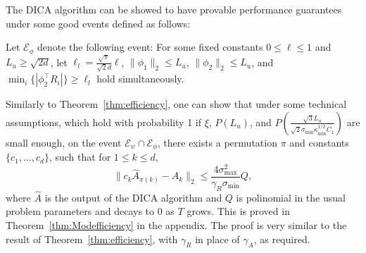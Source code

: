 \documentclass[twoside,11pt]{article}
\newcommand{\Epsi}{\mathcal{E}_{\psi}}
\newcommand{\Ephi}{\mathcal{E}_{\phi}}
\begin{document}
The DICA algorithm can be showed to have provable performance guarantees under some good events defined as follows:
\begin{definition}
Let $\Ephi$ denote the following event:
For some fixed constants $0\le \ell\le 1$ and $L_u \ge \sqrt{2d}$, let $\ell_l = \frac{\sqrt{\pi}}{\sqrt{2}d}\ell$,
$\|\phi_1\|_2 \le L_u$, $\|\phi_2\|_2 \le L_u$, and $\min_i \{|\phi_2^{\top}R_i|\} \ge \ell_l$ hold simultaneously.
\end{definition}  
Similarly to Theorem~\ref{thm:efficiency}, one can show that under some technical assumptions, which 
hold with probability 1 if $\xi$, $P(L_u)$, and $P\left(\frac{\sqrt{3}L_u}{\sqrt{2}\sigma_{\min}\kappa_{\min}^{1/2}C_1}\right)$  are small enough,
on the event $\Epsi \cap\Ephi$,  there exists a permutation $\pi$ and constants $\{c_1,\ldots,c_d\}$, such that for $1\le k\le d$,
\[
\| c_k\hat{A}_{\pi(k)} - A_k\|_2 \le \frac{4\sigma^2_{\max}}{\gamma_R\sigma_{\min}} Q,
\]
where $\hat{A}$ is the output of the DICA algorithm and $Q$ is polinomial in the usual problem parameters and decays to 0 as $T$ grows. %
This is proved in Theorem~\ref{thm:Modefficiency} in the appendix.
The proof is very similar to the result of Theorem~\ref{thm:efficiency}, with $\gamma_R$ in place of $\gamma_A$, as required.
\end{document}
